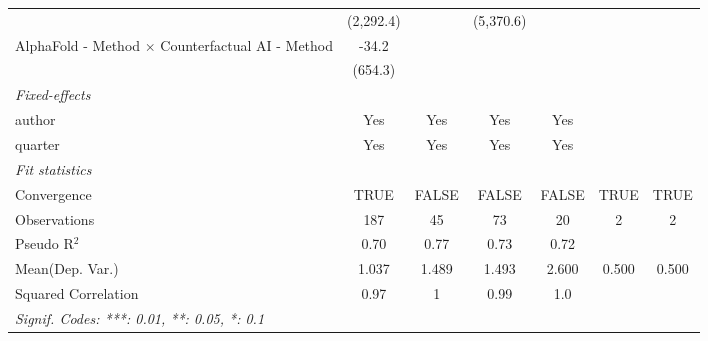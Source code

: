 \begin{tabular}{lcccccc}
                                                           & (2,292.4) &              & (5,370.6)  &               &      &   \\   
   AlphaFold - Method $\times$ Counterfactual AI - Method  & -34.2     &              &            &               &      &   \\   
                                                           & (654.3)   &              &            &               &      &   \\   
   \midrule
   \emph{Fixed-effects}\\
   author                                                  & Yes       & Yes          & Yes        & Yes           &      & \\  
   quarter                                                 & Yes       & Yes          & Yes        & Yes           &      & \\  
   \midrule
   \emph{Fit statistics}\\
   Convergence                                             &TRUE       & FALSE        & FALSE      & FALSE         & TRUE & TRUE\\  
   Observations                                            & 187       & 45           & 73         & 20            & 2    & 2\\  
   Pseudo R$^2$                                            & 0.70      & 0.77         & 0.73       & 0.72          &      & \\  
Mean(Dep. Var.) & 1.037 & 1.489 & 1.493 & 2.600 & 0.500 & 0.500 \\
   Squared Correlation                                     & 0.97      & 1            & 0.99       & 1.0           &      & \\  
   \midrule \midrule
   \multicolumn{7}{l}{\emph{Signif. Codes: ***: 0.01, **: 0.05, *: 0.1}}\\
\end{tabular}
\par\endgroup
